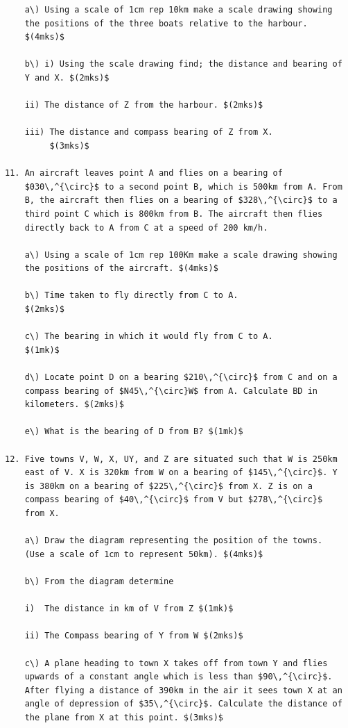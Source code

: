 \documentclass[
  a4paperpaper,
]{scrbook}
\begin{document}
\begin{tcolorbox}
\begin{verbatim}
    a\) Using a scale of 1cm rep 10km make a scale drawing showing
    the positions of the three boats relative to the harbour.
    $(4mks)$

    b\) i) Using the scale drawing find; the distance and bearing of
    Y and X. $(2mks)$

    ii) The distance of Z from the harbour. $(2mks)$

    iii) The distance and compass bearing of Z from X.
         $(3mks)$

11. An aircraft leaves point A and flies on a bearing of
    $030\,^{\circ}$ to a second point B, which is 500km from A. From
    B, the aircraft then flies on a bearing of $328\,^{\circ}$ to a
    third point C which is 800km from B. The aircraft then flies
    directly back to A from C at a speed of 200 km/h.

    a\) Using a scale of 1cm rep 100Km make a scale drawing showing
    the positions of the aircraft. $(4mks)$

    b\) Time taken to fly directly from C to A.
    $(2mks)$

    c\) The bearing in which it would fly from C to A.
    $(1mk)$

    d\) Locate point D on a bearing $210\,^{\circ}$ from C and on a
    compass bearing of $N45\,^{\circ}W$ from A. Calculate BD in
    kilometers. $(2mks)$

    e\) What is the bearing of D from B? $(1mk)$

12. Five towns V, W, X, UY, and Z are situated such that W is 250km
    east of V. X is 320km from W on a bearing of $145\,^{\circ}$. Y
    is 380km on a bearing of $225\,^{\circ}$ from X. Z is on a
    compass bearing of $40\,^{\circ}$ from V but $278\,^{\circ}$
    from X.

    a\) Draw the diagram representing the position of the towns.
    (Use a scale of 1cm to represent 50km). $(4mks)$

    b\) From the diagram determine

    i)  The distance in km of V from Z $(1mk)$

    ii) The Compass bearing of Y from W $(2mks)$

    c\) A plane heading to town X takes off from town Y and flies
    upwards of a constant angle which is less than $90\,^{\circ}$.
    After flying a distance of 390km in the air it sees town X at an
    angle of depression of $35\,^{\circ}$. Calculate the distance of
    the plane from X at this point. $(3mks)$


\end{verbatim}
\end{tcolorbox}
\end{document}
